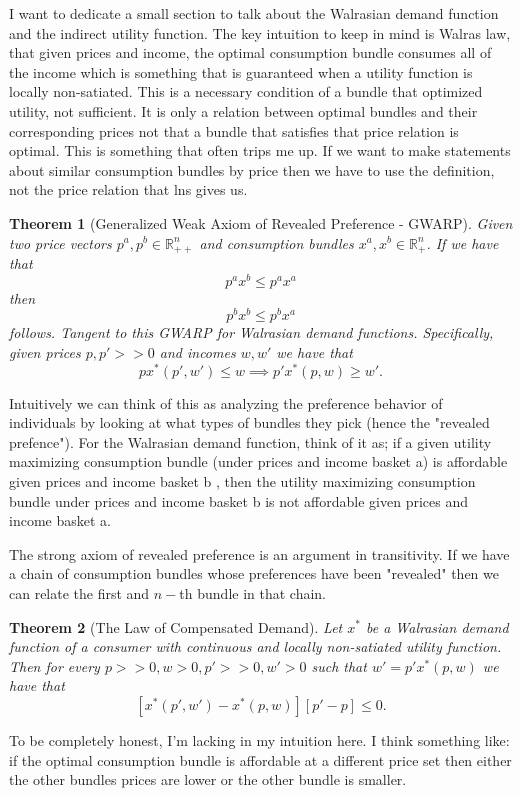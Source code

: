 \documentclass[11pt,english]{article}
\newtheorem{theorem}{Theorem}[section]
\begin{document}
I want to dedicate a small section to talk about the Walrasian demand function and the indirect utility function. The key intuition to keep in mind is Walras law, that given prices and income, the optimal consumption bundle consumes all of the income which is something that is guaranteed when a utility function is locally non-satiated. This is a necessary condition of a bundle that optimized utility, not sufficient. It is only a relation between optimal bundles and their corresponding prices not that a bundle that satisfies that price relation is optimal. This is something that often trips me up. If we want to make statements about similar consumption bundles by price then we have to use the definition, not the price relation that lns gives us.

\begin{theorem}[Generalized Weak Axiom of Revealed Preference - GWARP]
Given two price vectors $p^a, p^b \in \mathbb{R}_{++}^n$ and consumption bundles $x^a, x^b \in \mathbb{R}_+^n$. If we have that $$p^ax^b \leq p^a x^a$$ then $$p^b x^b \leq p^b x^a$$ follows. Tangent to this GWARP for Walrasian demand functions. Specifically, given prices $p, p' >> 0$ and incomes $w, w'$ we have that $$px^*(p',w') \leq w \implies p'x^*(p,w) \geq w'.$$
\end{theorem} Intuitively we can think of this as analyzing the preference behavior of individuals by looking at what types of bundles they pick (hence the "revealed prefence"). For the Walrasian demand function, think of it as; if a given utility maximizing consumption bundle (under prices and income basket a) is affordable given prices and income basket b , then the utility maximizing consumption bundle under prices and income basket b is not affordable given prices and income basket a. 

The strong axiom of revealed preference is an argument in transitivity. If we have a chain of consumption bundles whose preferences have been "revealed" then we can relate the first and $n-$th bundle in that chain.

\begin{theorem}[The Law of Compensated Demand]
Let $x^*$ be a Walrasian demand function of a consumer with continuous and locally non-satiated utility function. Then for every $p >> 0, w>0, p'>>0, w'> 0$ such that $w' = p'x^*(p,w)$ we have that $$[x^*(p',w') - x^*(p,w)][p'-p] \leq 0.$$
\end{theorem} To be completely honest, I'm lacking in my intuition here. I think something like: if the optimal consumption bundle is affordable at a different price set then either the other bundles prices are lower or the other bundle is smaller.
\end{document}
